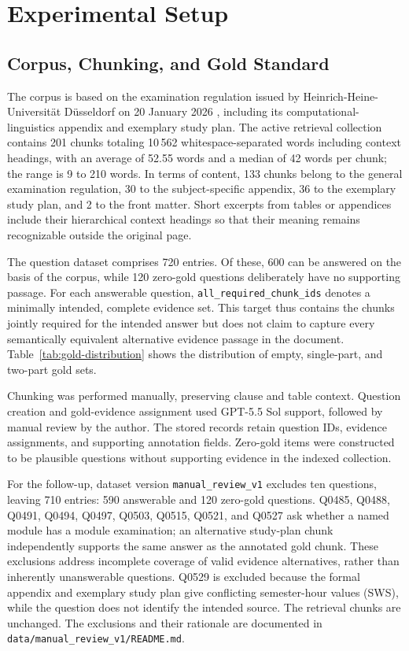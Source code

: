 \documentclass[11pt]{article}
\begin{document}
\section{Experimental Setup}

\subsection{Corpus, Chunking, and Gold Standard}

The corpus is based on the examination regulation issued by Heinrich-Heine-Universit\"at D\"usseldorf on 20 January 2026 \citep{hhu2026regulation}, including its computational-linguistics appendix and exemplary study plan. The active retrieval collection contains 201 chunks totaling 10{\,}562 whitespace-separated words including context headings, with an average of 52.55 words and a median of 42 words per chunk; the range is 9 to 210 words. In terms of content, 133 chunks belong to the general examination regulation, 30 to the subject-specific appendix, 36 to the exemplary study plan, and 2 to the front matter. Short excerpts from tables or appendices include their hierarchical context headings so that their meaning remains recognizable outside the original page.

The question dataset comprises 720 entries. Of these, 600 can be answered on the basis of the corpus, while 120 zero-gold questions deliberately have no supporting passage. For each answerable question, \texttt{all\_required\_chunk\_ids} denotes a minimally intended, complete evidence set. This target thus contains the chunks jointly required for the intended answer but does not claim to capture every semantically equivalent alternative evidence passage in the document. Table~\ref{tab:gold-distribution} shows the distribution of empty, single-part, and two-part gold sets.

Chunking was performed manually, preserving clause and table context. Question creation and gold-evidence assignment used GPT-5.5 Sol support, followed by manual review by the author. The stored records retain question IDs, evidence assignments, and supporting annotation fields. Zero-gold items were constructed to be plausible questions without supporting evidence in the indexed collection.

For the follow-up, dataset version \texttt{manual\_review\_v1} excludes ten questions, leaving 710 entries: 590 answerable and 120 zero-gold questions. Q0485, Q0488, Q0491, Q0494, Q0497, Q0503, Q0515, Q0521, and Q0527 ask whether a named module has a module examination; an alternative study-plan chunk independently supports the same answer as the annotated gold chunk. These exclusions address incomplete coverage of valid evidence alternatives, rather than inherently unanswerable questions. Q0529 is excluded because the formal appendix and exemplary study plan give conflicting semester-hour values (SWS), while the question does not identify the intended source. The retrieval chunks are unchanged. The exclusions and their rationale are documented in \nolinkurl{data/manual_review_v1/README.md}.
\end{document}
